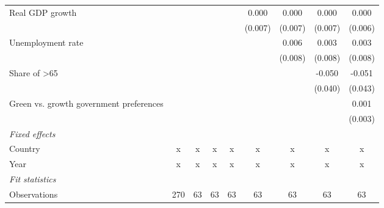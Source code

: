 \begin{table}[htbp]
\begin{tabular}{lcccccccc}
      Real GDP growth                                                        &         &         &               &                & 0.000          & 0.000          & 0.000          & 0.000\\   
                                                                             &         &         &               &                & (0.007)        & (0.007)        & (0.007)        & (0.006)\\   
      Unemployment rate                                                      &         &         &               &                &                & 0.006          & 0.003          & 0.003\\   
                                                                             &         &         &               &                &                & (0.008)        & (0.008)        & (0.008)\\   
      Share of >65                                                           &         &         &               &                &                &                & -0.050         & -0.051\\   
                                                                             &         &         &               &                &                &                & (0.040)        & (0.043)\\   
      Green vs. growth government preferences                                &         &         &               &                &                &                &                & 0.001\\   
                                                                             &         &         &               &                &                &                &                & (0.003)\\   
      \emph{Fixed effects}\\
      Country                                                                & x       & x       & x             & x              & x              & x              & x              & x\\  
      Year                                                                   & x       & x       & x             & x              & x              & x              & x              & x\\  
      \midrule \emph{Fit statistics}\\
      Observations                                                           & 270     & 63      & 63            & 63             & 63             & 63             & 63             & 63\\  

\end{tabular}
\end{table}
